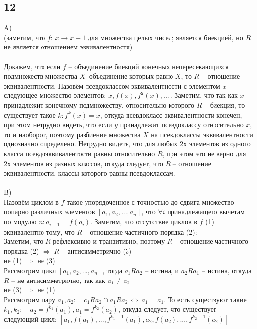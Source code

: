 		\subsection{12}
		A)\\
		(заметим, что $f$: $x \to x+1$ для множества целых чисел; является биекцией, но $R$ не является отношением эквивалентности)\\
		\\
		Докажем, что если $f$ -- объединение биекций конечных непересекающихся подмножеств множества $X$, объединение которых равно $X$, то $R$ -- отношение эквивалентности. Назовём псевдоклассом эквивалентности с элементом $x$ следующее множество элементов: $x, f(x), f^2(x), ... \ $. Заметим, что так как $x$ принадлежит конечному подмножеству, относительно которого $R$ -- биекция, то существует такое $k: f^k(x) = x$, откуда псевдокласс эквивалентности конечен, при этом нетрудно видеть, что если $y$ принадлежит псевдоклассу относительно $x$, то и наоборот, поэтому разбиение множества $X$ на псевдоклассы эквивалентности однозначно определено. Нетрудно видеть, что для любых 2х элементов из одного класса псевдоэквивалентости равны относительно $R$, при этом это не верно для 2х элементов из разных классов, откуда следует, что $R$ -- отношение эквивалентности, классы которого равны псевдоклассам.
		\\ \\
		B)\\
		Назовём циклом в $f$ такое упорядоченное с точностью до сдвига множество попарно различных элементов $[a_1, a_2, ... , a_n]$, что $\forall i$ принадлежащего вычетам по модулю $n: a_{i+1} = f(a_i)$. Заметим, что отсутствие циклов в $f$ (1) эквивалентно тому, что $R$ -- отношение частичного порядка (2): \\
		Заметим, что $R$ рефлексивно и транзитивно, поэтому $R$ -- отношение частичного порядка (2) $\Leftrightarrow$ $R$ -- антисимметрично (3) \\
		не (1) $\Rightarrow$ не (3) \\
		Рассмотрим цикл $[a_1, a_2, ... , a_n]$, тогда $a_1 R a_2$ -- истина, и $a_2 R a_1$ -- истина, откуда $R$ -- не антисимметрично, так как $a_1 \ne a_2$ \\
		не (3) $\Rightarrow$ не (1) \\
		Рассмотрим пару $a_1, a_2: \quad a_1 R a_2 \cap a_1 R a_2 \ \Leftrightarrow \ a_1 = a_1$. То есть существуют такие $k_1, k_2: \quad a_2 = f^{k_1}(a_1), a_1 = f^{k_2}(a_2)$, откуда следует, что существует следующий цикл: $[a_1, f(a_1), ... , f^{k_1 - 1}(a_1), a_2, f(a_2), ... , f^{k_2 - 1}(a_2)]$

